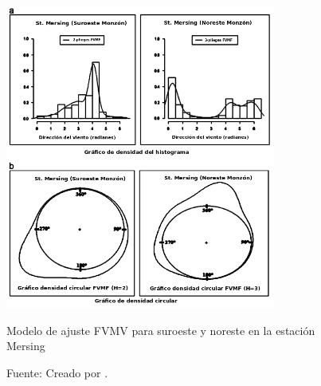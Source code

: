 \begin{figure}[h!]
    \centering    
    \includegraphics[height=100mm]{figures/wind_dir_vonMises.png} 
    \caption{Modelo de ajuste FVMV para suroeste y noreste en la estación Mersing}
    \vspace{-.25cm} 
    \caption*{Fuente: Creado por \cite{Winddirelse15}.}
    \label{fig:wind_dir_vonMises}
\end{figure}

